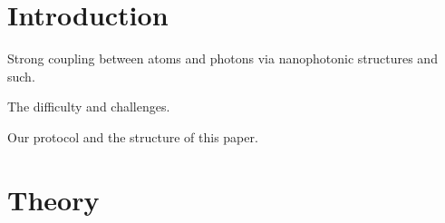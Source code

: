 \documentclass[preprint,aps,pra,onecolumn,superscriptaddress]{revtex4-1} %
\begin{document}
\section{Introduction}

Strong coupling between atoms and photons via nanophotonic structures and such.

The difficulty and challenges.

Our protocol and the structure of this paper.


\section{Theory} \label{Sec::Theory}
\end{document}
